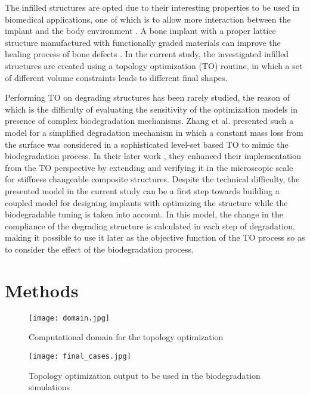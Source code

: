 The infilled structures are opted due to their interesting properties to be used in biomedical applications, one of which is to allow more interaction between the implant and the body environment \cite{Birmingham2012}. A bone implant with a proper lattice structure manufactured with functionally graded materials can improve the healing process of bone defects \cite{Mahmoud2017}. In the current study, the investigated infilled structures are created using a topology optimization (TO) routine, in which a set of different volume constraints leads to different final shapes. 

Performing TO on degrading structures has been rarely studied, the reason of which is the difficulty of evaluating the sensitivity of the optimization models in presence of complex biodegradation mechanisms. Zhang et al. \cite{Zhang2021} presented such a model for a simplified degradation mechanism in which a constant mass loss from the surface was considered in a sophisticated level-set based TO to mimic the biodegradation process. In their later work \cite{Zhang2021a}, they enhanced their implementation from the TO perspective by extending and verifying it in the microscopic scale for stiffness changeable composite structures. Despite the technical difficulty, the presented model in the current study can be a first step towards building a coupled model for designing implants with optimizing the structure while the biodegradable tuning is taken into account. In this model, the change in the compliance of the degrading structure is calculated in each step of degradation, making it possible to use it later as the objective function of the TO process so as to consider the effect of the biodegradation process.


\section{Methods}

\begin{figure}[h]
\centering
\medskip
\texttt{[image: domain.jpg]}
\caption[Computational domain for the topology optimization]{Computational domain for the topology optimization} \label{fig:infill_domain}
\end{figure}


\begin{figure}[h]
\centering
\medskip
\texttt{[image: final\_cases.jpg]}
\caption[Topology optimization output to be used in the biodegradation simulations]{Topology optimization output to be used in the biodegradation simulations} \label{fig:infill_final_cases}
\end{figure}


